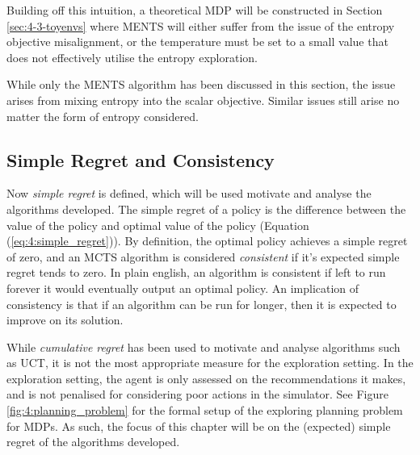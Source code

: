         Building off this intuition, a theoretical MDP will be constructed in Section \ref{sec:4-3-toyenvs} where MENTS will either suffer from the issue of the entropy objective misalignment, or the temperature must be set to a small value that does not effectively utilise the entropy exploration. 
        
        While only the MENTS algorithm has been discussed in this section, the issue arises from mixing entropy into the scalar objective. Similar issues still arise no matter the form of entropy considered.



    \subsection{Simple Regret and Consistency}


        Now \textit{simple regret} is defined, which will be used motivate and analyse the algorithms developed. The simple regret of a policy is the difference between the value of the policy and optimal value of the policy (Equation (\ref{eq:4:simple_regret})). By definition, the optimal policy achieves a simple regret of zero, and an MCTS algorithm is considered \textit{consistent} if it's expected simple regret tends to zero. In plain english, an algorithm is consistent if left to run forever it would eventually output an optimal policy. An implication of consistency is that if an algorithm can be run for longer, then it is expected to improve on its solution.

        While \textit{cumulative regret}  has been used to motivate and analyse algorithms such as UCT, it is not the most appropriate measure for the exploration setting. In the exploration setting, the agent is only assessed on the recommendations it makes, and is not penalised for considering poor actions in the simulator. See Figure \ref{fig:4:planning_problem} for the formal setup of the exploring planning problem for MDPs. As such, the focus of this chapter will be on the (expected) simple regret of the algorithms developed.

